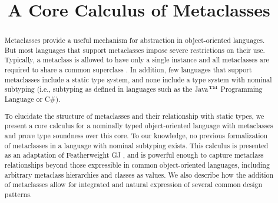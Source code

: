 \documentclass[10pt]{acm-sigplan}
\begin{document}

\title{A Core Calculus of Metaclasses}



\maketitle


\begin{abstract}
Metaclasses provide a useful mechanism for abstraction in
object-oriented languages.  But most languages that support metaclasses
 impose severe restrictions on their use. Typically, a metaclass
is allowed to have only a single instance and all metaclasses are
required to share a common superclass \cite{objvlisp}. In addition,
few languages that support metaclasses include a static type
system, and none include a type system with nominal subtyping
(i.e., subtyping as defined in languages such as the
Java${^{\mbox{\tiny{TM}}}}$ Programming Language or C\#).

To elucidate the structure of metaclasses and their relationship with
static types, we present a core calculus for a nominally typed
object-oriented language with metaclasses and prove type soundness
over this core.  To our knowledge, no previous formalization of
metaclasses in a language with nominal subtyping exists.  This
calculus is presented as an adaptation of Featherweight GJ \cite{FJ},
and is powerful enough to capture metaclass relationships beyond those
expressible in common object-oriented languages, including arbitrary
metaclass hierarchies and classes as values.  We also describe how the
addition of metaclasses allow for integrated and natural expression of
several common design patterns.
\end{abstract}
\end{document}

